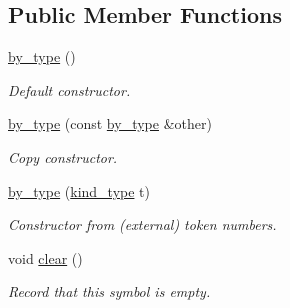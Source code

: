 \subsection*{Public Member Functions}
\begin{DoxyCompactItemize}
\item 
\mbox{\label{structyy_1_1parser_1_1by__type_a16c7227367f85b611980ed547f545483}} 
\hyperlink{structyy_1_1parser_1_1by__type_a16c7227367f85b611980ed547f545483}{by\+\_\+type} ()
\begin{DoxyCompactList}\small\item\em Default constructor. \end{DoxyCompactList}\item 
\mbox{\label{structyy_1_1parser_1_1by__type_aa99c31c49c133c9ec3fe3f06ee30692c}} 
\hyperlink{structyy_1_1parser_1_1by__type_aa99c31c49c133c9ec3fe3f06ee30692c}{by\+\_\+type} (const \hyperlink{structyy_1_1parser_1_1by__type}{by\+\_\+type} \&other)
\begin{DoxyCompactList}\small\item\em Copy constructor. \end{DoxyCompactList}\item 
\mbox{\label{structyy_1_1parser_1_1by__type_a7f43ae4d6b5ae70d2a7ef537c1ea42b2}} 
\hyperlink{structyy_1_1parser_1_1by__type_a7f43ae4d6b5ae70d2a7ef537c1ea42b2}{by\+\_\+type} (\hyperlink{structyy_1_1parser_1_1by__type_af8757490fd5397ad574e9fee1b80fa25}{kind\+\_\+type} t)
\begin{DoxyCompactList}\small\item\em Constructor from (external) token numbers. \end{DoxyCompactList}\item 
\mbox{\label{structyy_1_1parser_1_1by__type_a54b8dbdb29a33649edc7832d74637afe}} 
void \hyperlink{structyy_1_1parser_1_1by__type_a54b8dbdb29a33649edc7832d74637afe}{clear} ()
\begin{DoxyCompactList}\small\item\em Record that this symbol is empty. \end{DoxyCompactList}\item 
\mbox{\label{structyy_1_1parser_1_1by__type_a68911dec3423e0748fd56f369d1b5d10}} 

\end{DoxyCompactItemize}
